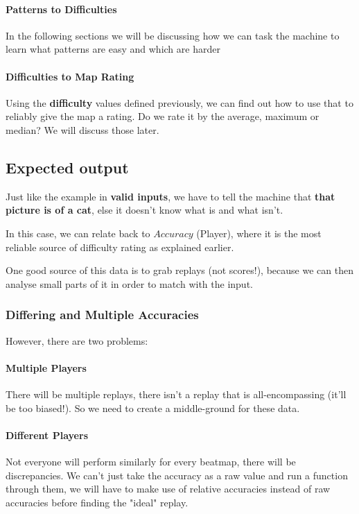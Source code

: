 \documentclass{article}
\begin{document}
\paragraph{Patterns to Difficulties} In the following sections we will be discussing how we can task the machine to learn what patterns are easy and which are harder

\paragraph{Difficulties to Map Rating} Using the \textbf{difficulty} values defined previously, we can find out how to use that to reliably give the map a rating. Do we rate it by the average, maximum or median? We will discuss those later.

\subsection{Expected output}

Just like the example in \textbf{valid inputs}, we have to tell the machine that \textbf{that picture is of a cat}, else it doesn't know what is and what isn't.

In this case, we can relate back to $Accuracy$ (Player), where it is the most reliable source of difficulty rating as explained earlier.

One good source of this data is to grab replays (not scores!), because we can then analyse small parts of it in order to match with the input. 

\subsubsection{Differing and Multiple Accuracies}

However, there are two problems:

\paragraph{Multiple Players} There will be multiple replays, there isn't a replay that is all-encompassing (it'll be too biased!). So we need to create a middle-ground for these data.

\paragraph{Different Players} Not everyone will perform similarly for every beatmap, there will be discrepancies. We can't just take the accuracy as a raw value and run a function through them, we will have to make use of relative accuracies instead of raw accuracies before finding the "ideal" replay.
\end{document}
